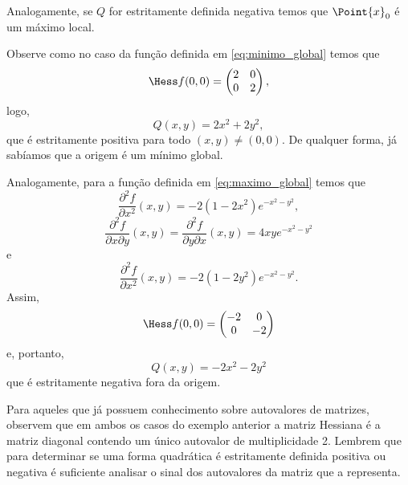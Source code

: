 Analogamente, se $Q$ for estritamente definida negativa temos que $\Point{x}_0$ é um máximo local. 

\begin{example}{}{}
Observe como no caso da função definida em \eqref{eq:minimo_global} temos que 
$$\Hess f(0,0)= \begin{pmatrix}
    2&0\\
    0&2
\end{pmatrix},$$
logo,
$$Q(x,y)=2x^2+2y^2,$$
que é estritamente positiva para todo $(x,y)\neq (0,0)$. De qualquer forma, já sabíamos que a origem é um mínimo global. 

Analogamente, para a função definida em \eqref{eq:maximo_global} temos que 
$$\dfrac{\partial^2 f}{\partial x^2}(x,y)=-2(1-2x^2)e^{-x^2-y^2},$$
$$\dfrac{\partial^2 f}{\partial x \partial y}(x,y)=\dfrac{\partial^2 f}{\partial y \partial x}(x,y)=4xye^{-x^2-y^2}$$
e
$$\dfrac{\partial^2 f}{\partial x^2}(x,y)=-2(1-2y^2)e^{-x^2-y^2}.$$
Assim, 
$$\Hess f(0,0)= 
\begin{pmatrix}
    -2&0\\
    0&-2
\end{pmatrix}$$
e, portanto, 
$$Q(x,y) = -2x^2-2 y^2$$
que é estritamente negativa fora da origem. 
\end{example}
Para aqueles que já possuem conhecimento sobre autovalores de matrizes, observem que em ambos os casos do exemplo anterior a matriz Hessiana é a matriz diagonal contendo um único autovalor de multiplicidade 2. Lembrem que para determinar se uma forma quadrática é estritamente definida positiva ou negativa é suficiente analisar o sinal dos autovalores da matriz que a representa. 

